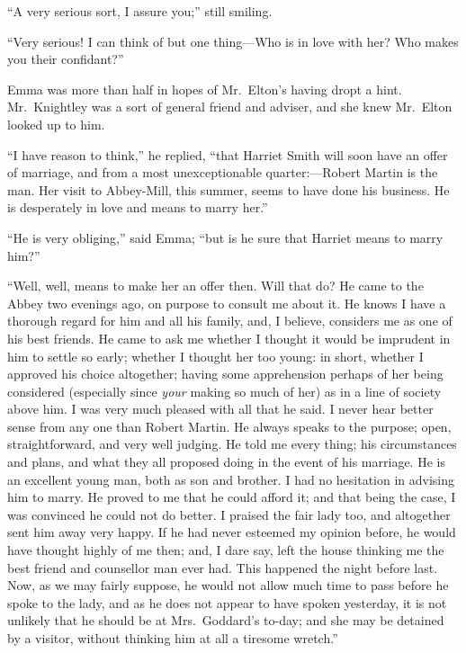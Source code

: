 ``A very serious sort, I assure you;'' still smiling.

``Very serious! I can think of but one thing---Who is in love
with her? Who makes you their confidant?''

Emma was more than half in hopes of Mr.\ Elton's having dropt a hint.
Mr.\ Knightley was a sort of general friend and adviser, and she knew
Mr.\ Elton looked up to him.

``I have reason to think,'' he replied, ``that Harriet Smith will
soon have an offer of marriage, and from a most unexceptionable
quarter:---Robert Martin is the man.  Her visit to Abbey-Mill,
this summer, seems to have done his business.  He is desperately
in love and means to marry her.''

``He is very obliging,'' said Emma; ``but is he sure that Harriet
means to marry him?''

``Well, well, means to make her an offer then.  Will that do? He came
to the Abbey two evenings ago, on purpose to consult me about it.
He knows I have a thorough regard for him and all his family, and,
I believe, considers me as one of his best friends.  He came to ask
me whether I thought it would be imprudent in him to settle so early;
whether I thought her too young: in short, whether I approved his
choice altogether; having some apprehension perhaps of her being
considered (especially since \emph{your} making so much of her) as in a line
of society above him.  I was very much pleased with all that he said.
I never hear better sense from any one than Robert Martin.
He always speaks to the purpose; open, straightforward, and very
well judging.  He told me every thing; his circumstances and plans,
and what they all proposed doing in the event of his marriage.  He is
an excellent young man, both as son and brother.  I had no hesitation
in advising him to marry.  He proved to me that he could afford it;
and that being the case, I was convinced he could not do better.
I praised the fair lady too, and altogether sent him away very happy.
If he had never esteemed my opinion before, he would have thought
highly of me then; and, I dare say, left the house thinking me the
best friend and counsellor man ever had.  This happened the night
before last.  Now, as we may fairly suppose, he would not allow
much time to pass before he spoke to the lady, and as he does not
appear to have spoken yesterday, it is not unlikely that he should
be at Mrs.\ Goddard's to-day; and she may be detained by a visitor,
without thinking him at all a tiresome wretch.''

